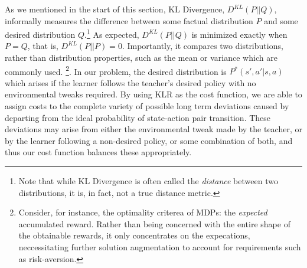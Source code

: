As we mentioned in the start of this section, KL Divergence,
$D^{KL}(P||Q)$, informally measures the difference between some
factual distribution $P$ and some desired distribution
$Q$.\footnote{Note that while KL Divergence is often called the
  \emph{distance} between two distributions, it is, in fact, not a
  true distance metric.}  As expected, $D^{KL}(P||Q)$ is minimized
exactly when $P=Q$, that is, $D^{KL}(P||P)=0$. Importantly, it
compares two distributions, rather than distribution properties, such
as the mean or variance which are commonly used. \footnote{Consider,
  for instance, the optimality criterea of MDPs: the {\em expected}
  accumulated reward. Rather than being concerned with the entire
  shape of the obtainable rewards, it only concentrates on the
  expecations, neccessitating further solution augmentation to account
  for requirements such as risk-aversion.}. In our problem, the
desired distribution is $P^*(s',a'|s,a)$ which arises if the learner
follows the teacher's desired policy with no environmental tweaks
required.  By using KLR as the cost function, we are able to assign
costs to the complete variety of possible long term deviations caused
by departing from the ideal probability of state-action pair
transition.  These deviations may arise from either the environmental
tweak made by the teacher, or by the learner following a non-desired
policy, or some combination of both, and thus our cost function
balances these appropriately.





